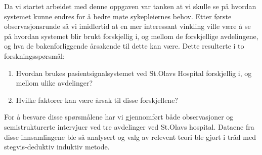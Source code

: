 \noindent
Da vi startet arbeidet med denne oppgaven var tanken at vi skulle se på hvordan systemet kunne endres for å bedre møte sykepleiernes behov. Etter første observasjonsrunde så vi imidlertid at en mer interessant vinkling ville være å se på hvordan systemet blir brukt forskjellig i, og mellom de forskjellige avdelingene, og hva de bakenforliggende årsakende til dette kan være. Dette resulterte i to forskningsspørsmål:

\begin{enumerate}
\item Hvordan brukes pasientsignalsystemet ved St.Olavs Hospital forskjellig i, og mellom ulike avdelinger? 
\item Hvilke faktorer kan være årsak til disse forskjellene?
\end{enumerate}

\noindent
For å besvare disse spørsmålene har vi gjennomført både observasjoner og semistrukturerte intervjuer ved tre avdelinger ved St.Olavs hospital. Dataene fra disse innsamlingene ble så analysert og valg av relevent teori ble gjort i tråd med stegvis-deduktiv induktiv metode.
